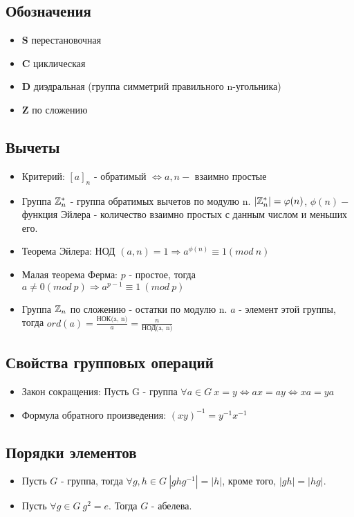 \documentclass[11pt,a4paper]{article}
\author{\texttt{ремикс кирилла}}\date{}
\begin{document}
\renewcommand{\labelitemi}{$\circ  $}
		\subsection*{Обозначения}
		\begin{itemize}

			\item $\mathbf{S}$  перестановочная
			\item $\mathbf{C}$  циклическая
			\item $\mathbf{D}$  диэдральная (группа симметрий правильного n-угольника)
			\item $\mathbf{Z}$  по сложению
		\end{itemize}
		\subsection*{Вычеты}
		\begin{itemize}
			\item Критерий: $[a]_n$ - обратимый $\Longleftrightarrow a, n -  $ взаимно простые
			\item Группа $\mathbb{Z}^*_n$ - группа обратимых вычетов по модулю n. $|\mathbb{Z}^*_n| = \varphi(n)$, $\phi(n) - $ функция Эйлера - количество взаимно простых с данным числом и меньших его.
			\item Теорема Эйлера: НОД $(a, n) = 1 \Rightarrow a^{\phi(n)} \equiv 1 (mod \ n) $
			\item Малая теорема Ферма: $p$ - простое, тогда $a \neq 0 (mod \ p) \Rightarrow a^{p - 1} \equiv 1 \ (mod \ p) $
			\item Группа $\mathbb{Z}_n $ по сложению - остатки по модулю n. $a$ - элемент этой группы, тогда $ord(a) = \frac{\text{НОК(a, n)}}{a} = \frac{n}{\text{НОД(a, n)}} $
		\end{itemize} 
		\subsection*{Свойства групповых операций}
		\begin{itemize}
			\item Закон сокращения: Пусть G - группа $\forall a \in G \ x = y \Leftrightarrow ax = ay \Leftrightarrow xa = ya $
			\item Формула обратного произведения: $(xy)^{-1} = y^{-1}x^{-1} $
		\end{itemize}
		\subsection*{Порядки элементов}
		\begin{itemize}
			\item Пусть  $G$ - группа, тогда $\forall g, h \in G  \ |ghg^{-1}| = |h|$, кроме того, $|gh| = |hg|$.
			\item Пусть $\forall g \in G \  g^2 = e$. Тогда $G$ - абелева.
		\end{itemize}
\end{document}
